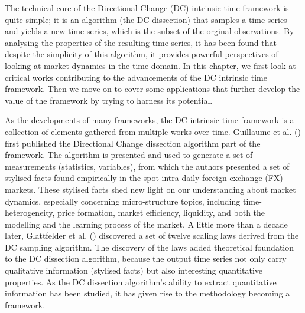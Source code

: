 The technical core of the Directional Change (DC) intrinsic time framework is quite simple; it is an algorithm (the DC dissection) that samples a time series and yields a new time series, which is the subset of the orginal observations. By analysing the properties of the resulting time series, it has been found that despite the simplicity of this algorithm, it provides powerful perspectives of looking at market dynamics in the time domain. In this chapter, we first look at critical works contributing to the advancements of the DC intrinsic time framework. Then we move on to cover some applications that further develop the value of the framework by trying to harness its potential.

As the developments of many frameworks, the DC intrinsic time framework is a collection of elements gathered from multiple works over time. Guillaume et al. (\citeyear{guillaume1997bird}) first published the Directional Change dissection algorithm part of the framework. The algorithm is presented and used to generate a set of measurements (statistics, variables), from which the authors presented a set of stylised facts found empirically in the spot intra-daily foreign exchange (FX) markets. These stylised facts shed new light on our understanding about market dynamics, especially concerning micro-structure topics, including time-heterogeneity, price formation, market efficiency, liquidity, and both the modelling and the learning process of the market. A little more than a decade later, Glattfelder et al. (\citeyear{glattfelder2011patterns}) discovered a set of twelve scaling laws derived from the DC sampling algorithm. The discovery of the laws added theoretical foundation to the DC dissection algorithm, because the output time series not only carry qualitative information (stylised facts) but also interesting quantitative properties. As the DC dissection algorithm's ability to extract quantitative information has been studied, it has given rise to the methodology becoming a framework.

